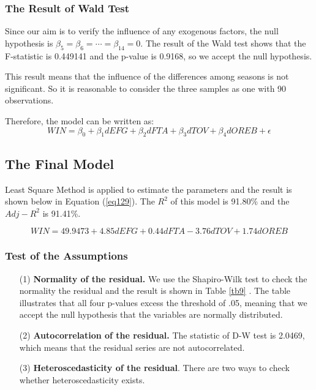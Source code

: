 \documentclass[12pt, a4paper]{article}
\begin{document}
\begin{spacing}{1.5}
\subsubsection{The Result of Wald Test}
Since our aim is to verify the influence of any exogenous factors, the null hypothesis is $\beta_5=\beta_6=\cdots=\beta_{14}=0$. The result of the Wald test shows that the F-statistic is 0.449141 and the p-value is  0.9168, so we accept the null hypothesis.

This result means that the influence of the differences among seasons is not significant. So it is reasonable to consider the three samples as one with 90 observations.

Therefore, the model can be written as:
\begin{equation}
	WIN = \beta_0+\beta_1dEFG + \beta_2dFTA+\beta_3dTOV+\beta_4dOREB + \epsilon
\end{equation}

\subsection{The Final Model}
Least Square Method is applied to estimate the parameters and the result is shown below in Equation (\ref{eq129}). The $R^2$ of this model is 91.80\% and the $Adj-R^2$ is 91.41\%.

\begin{equation}
	WIN=49.9473 + 4.85dEFG+0.44dFTA-3.76dTOV+1.74dOREB
	\label{eq129}
\end{equation}
\subsubsection{Test of the Assumptions}
\begin{itemize}
\item[(1)] \textbf{Normality of the residual.} We use the Shapiro-Wilk test to check the normality the residual and the result is shown in Table \ref{tb9} \cite{A}. The table illustrates that all four p-values excess the threshold of .05, meaning that we accept the null hypothesis that the variables are normally distributed.
\begin{table}[!ht]
\centering
{}
\caption{The Result of the Shapiro-Wilk Test}
\label{tb9}
\end{table}\item[(2)] \textbf{Autocorrelation of the residual.} The statistic of D-W test is 2.0469, which means that the residual series are not autocorrelated.
\item[(3)] \textbf{Heteroscedasticity of the residual}. There are two ways to check whether heteroscedasticity exists. 


\end{itemize}
\end{spacing}
\end{document}
